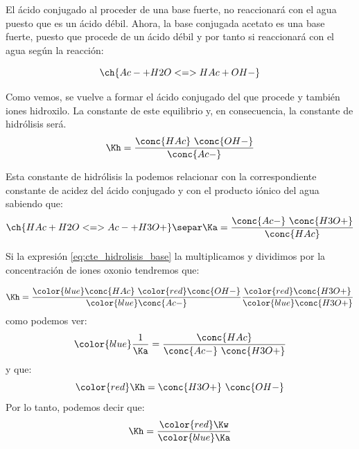     El ácido conjugado  al proceder de una base fuerte, no reaccionará con el agua puesto que es un ácido débil.
    Ahora, la base conjugada acetato  es una base fuerte, puesto que procede de un ácido débil y por tanto si reaccionará con el agua según la reacción:

    \begin{equation*}
        \ch{ Ac- + H2O <=> HAc + OH-}
    \end{equation*}

    Como vemos, se vuelve a formar el ácido conjugado del que procede y también iones hidroxilo.
    La constante de este equilibrio y, en consecuencia, la constante de hidrólisis \Kh{} será.
    \begin{equation}
        \Kh = \dfrac{\conc{HAc}\ \conc{OH-}}{\conc{Ac-}} \label{eq:cte_hidrolisis_base}
    \end{equation}


    Esta constante de hidrólisis \Kh la podemos relacionar con la correspondiente constante de acidez del ácido conjugado  y con el producto iónico del agua sabiendo que:
    \begin{gather*}
        \ch{HAc + H2O <=> Ac- + H3O+}\separ
        \Ka = \dfrac{\conc{Ac-}\ \conc{H3O+}}{\conc{HAc}}
    \end{gather*}

    Si la expresión \eqref{eq:cte_hidrolisis_base} la multiplicamos y dividimos por la concentración de iones oxonio  tendremos que:

    \begin{equation*}
        \Kh = \dfrac{{\color{blue}\conc{HAc}}\ {\color{red}\conc{OH-}}}{{\color{blue}\conc{Ac-}}}\dfrac{{\color{red}\conc{H3O+}}}{{\color{blue}\conc{H3O+}}}
    \end{equation*}
    como podemos ver:
    \begin{equation*}
        \color{blue} \dfrac{1}{\Ka} = \dfrac{\conc{HAc}}{\conc{Ac-}\ \conc{H3O+}}
    \end{equation*}
    y que:
    \begin{equation*}
        \color{red} \Kh = \conc{H3O+}\ \conc{OH-}
    \end{equation*}
    Por lo tanto, podemos decir que:
    \begin{equation*}
        \Kh = \dfrac{{\color{red}\Kw}}{{\color{blue}\Ka}}
    \end{equation*}
    
